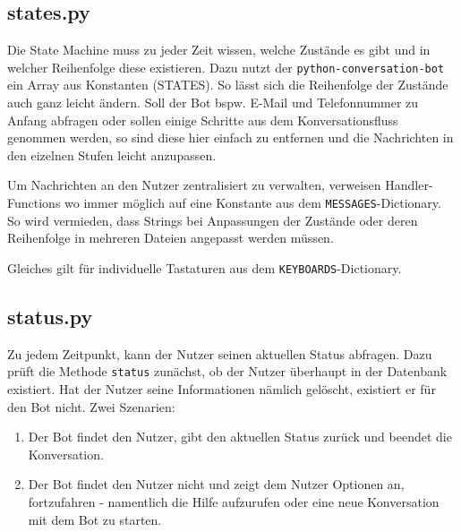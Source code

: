         \subsection{states.py} \label{states.py}
                Die State Machine muss zu jeder Zeit wissen, welche Zustände es gibt und in welcher Reihenfolge diese existieren. Dazu nutzt der \verb|python-conversation-bot| \cite{conversationBot} ein Array aus Konstanten (STATES). So lässt sich die Reihenfolge der Zustände auch ganz leicht ändern. Soll der Bot bspw. E-Mail und Telefonnummer zu Anfang abfragen oder sollen einige Schritte aus dem Konversationsfluss genommen werden, so sind diese hier einfach zu entfernen und die Nachrichten in den eizelnen Stufen leicht anzupassen.

                Um Nachrichten an den Nutzer zentralisiert zu verwalten, verweisen Handler-Functions wo immer möglich auf eine Konstante aus dem \verb|MESSAGES|-Dictionary. So wird vermieden, dass Strings bei Anpassungen der Zustände oder deren Reihenfolge in mehreren Dateien angepasst werden müssen.
            
                Gleiches gilt für individuelle Tastaturen aus dem \verb|KEYBOARDS|-Dictionary. 

        \subsection{status.py} \label{status.py}
                Zu jedem Zeitpunkt, kann der Nutzer seinen aktuellen Status abfragen. Dazu prüft die Methode \verb|status| zunächst, ob der Nutzer überhaupt in der Datenbank existiert. Hat der Nutzer seine Informationen nämlich gelöscht, existiert er für den Bot nicht. Zwei Szenarien: 
                \begin{enumerate}
                    \item Der Bot findet den Nutzer, gibt den aktuellen Status zurück und beendet die Konversation.
                    \item Der Bot findet den Nutzer nicht und zeigt dem Nutzer Optionen an, fortzufahren - namentlich die Hilfe aufzurufen oder eine neue Konversation mit dem Bot zu starten.
                \end{enumerate}
        

